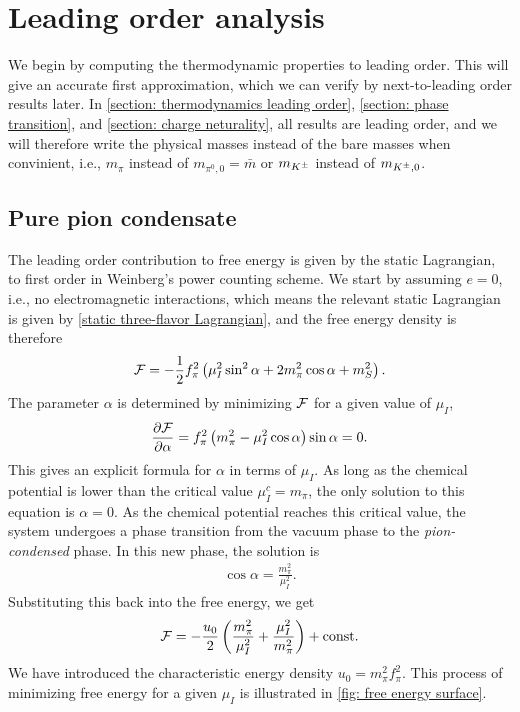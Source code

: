 \section{Leading order analysis}
\label{section: thermodynamics leading order}

We begin by computing the thermodynamic properties to leading order.
This will give an accurate first approximation, which we can verify by next-to-leading order results later.
In \autoref{section: thermodynamics leading order}, \autoref{section: phase transition}, and \autoref{section: charge neturality}, all results are leading order, and we will therefore write the physical masses instead of the bare masses when convinient, i.e., $m_\pi$ instead of $m_{\pi^0, 0} = \bar m$ or $m_{{K^\pm}}$ instead of $m_{{K^\pm},0}$.



\subsection{Pure pion condensate}
\label{subsection: pure pion condensate}


The leading order contribution to free energy is given by the static Lagrangian, to first order in Weinberg's power counting scheme.
We start by assuming $e = 0$, i.e., no electromagnetic interactions, which means the relevant static Lagrangian is given by \autoref{static three-flavor Lagrangian}, and the free energy density is therefore
%
\begin{equation}
    \label{free energy pion condensate}
    \mathcal{F} 
    = 
    - \frac{1}{2} f_\pi^2
    \left(
        \mu_I^2 \sin^2\alpha
        + 2m_\pi^2 \cos\alpha
        + m_S^2
    \right).
\end{equation}
%
The parameter $\alpha$ is determined by minimizing $\mathcal{F}$ for a given value of $\mu_I$,
%
\begin{equation}
    \pdv{\mathcal{F}}{\alpha} = f_\pi^2 \left(m_\pi^2 - \mu_I^2 \cos \alpha\right) \sin\alpha = 0.
\end{equation}
%
This gives an explicit formula for $\alpha$ in terms of $\mu_I$.
As long as the chemical potential is lower than the critical value $\mu_I^c = m_\pi$, the only solution to this equation is $\alpha = 0$.
As the chemical potential reaches this critical value, the system undergoes a phase transition from the vacuum phase to the \emph{pion-condensed} phase.
In this new phase, the solution is
%
\begin{align}
    \label{alpha as function of mu lowest order}
    \cos \alpha = \frac{m_\pi^2}{\mu_I^2}.
\end{align}
%
Substituting this back into the free energy, we get
%
\begin{equation}
    \mathcal{F} 
    = - \frac{u_0}{2} \left( \frac{m_\pi^2}{\mu_I^2} + \frac{\mu_I^2}{m_\pi^2}\right) +\mathrm{const.}
\end{equation}
%
We have introduced the characteristic energy density $u_0 = m_\pi^2 f_\pi^2$.
This process of minimizing free energy for a given $\mu_I$ is illustrated in \autoref{fig: free energy surface}.

